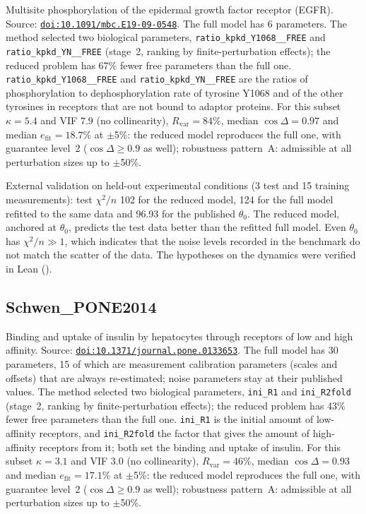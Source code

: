 Multisite phosphorylation of the epidermal growth factor receptor (EGFR). Source: \href{https://doi.org/10.1091/mbc.E19-09-0548}{\nolinkurl{doi:10.1091/mbc.E19-09-0548}}. The full model has 6 parameters. The method selected two biological parameters, \texttt{ratio\_kpkd\_Y1068\_\_FREE} and \texttt{ratio\_kpkd\_YN\_\_FREE} (stage~2, ranking by finite-perturbation effects); the reduced problem has 67\% fewer free parameters than the full one. \texttt{ratio\_kpkd\_Y1068\_\_FREE} and \texttt{ratio\_kpkd\_YN\_\_FREE} are the ratios of phosphorylation to dephosphorylation rate of tyrosine Y1068 and of the other tyrosines in receptors that are not bound to adaptor proteins. For this subset $\kappa=5.4$ and VIF $7.9$ (no collinearity), $R_{\mathrm{var}}=84\%$, median $\cos\Delta=0.97$ and median $e_{\mathrm{fit}}=18.7\%$ at $\pm$5\%: the reduced model reproduces the full one, with guarantee level~2 ($\cos\Delta\ge0.9$ as well); robustness pattern~A: admissible at all perturbation sizes up to $\pm$50\%.

External validation on held-out experimental conditions (3 test and 15 training measurements): test $\chi^2/n$ 102 for the reduced model, 124 for the full model refitted to the same data and 96.93 for the published $\theta_0$. The reduced model, anchored at $\theta_0$, predicts the test data better than the refitted full model. Even $\theta_0$ has $\chi^2/n\gg1$, which indicates that the noise levels recorded in the benchmark do not match the scatter of the data. The hypotheses on the dynamics were verified in Lean ().

\subsection*{Schwen\_PONE2014}

Binding and uptake of insulin by hepatocytes through receptors of low and high affinity. Source: \href{https://doi.org/10.1371/journal.pone.0133653}{\nolinkurl{doi:10.1371/journal.pone.0133653}}. The full model has 30 parameters, 15 of which are measurement calibration parameters (scales and offsets) that are always re-estimated; noise parameters stay at their published values. The method selected two biological parameters, \texttt{ini\_R1} and \texttt{ini\_R2fold} (stage~2, ranking by finite-perturbation effects); the reduced problem has 43\% fewer free parameters than the full one. \texttt{ini\_R1} is the initial amount of low-affinity receptors, and \texttt{ini\_R2fold} the factor that gives the amount of high-affinity receptors from it; both set the binding and uptake of insulin. For this subset $\kappa=3.1$ and VIF $3.0$ (no collinearity), $R_{\mathrm{var}}=46\%$, median $\cos\Delta=0.93$ and median $e_{\mathrm{fit}}=17.1\%$ at $\pm$5\%: the reduced model reproduces the full one, with guarantee level~2 ($\cos\Delta\ge0.9$ as well); robustness pattern~A: admissible at all perturbation sizes up to $\pm$50\%.


